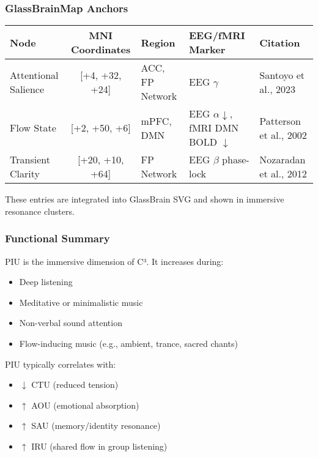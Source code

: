 \subsubsection*{GlassBrainMap Anchors}

\begin{center}
\begin{tabular}{|l|c|l|l|l|}
\hline
\textbf{Node} & \textbf{MNI Coordinates} & \textbf{Region} & \textbf{EEG/fMRI Marker} & \textbf{Citation} \\
\hline
Attentional Salience & [+4, +32, +24] & ACC, FP Network & EEG $\gamma$ & Santoyo et al., 2023 \\
Flow State & [+2, +50, +6] & mPFC, DMN & EEG $\alpha \downarrow$, fMRI DMN BOLD $\downarrow$ & Patterson et al., 2002 \\
Transient Clarity & [+20, +10, +64] & FP Network & EEG $\beta$ phase-lock & Nozaradan et al., 2012 \\
\hline
\end{tabular}
\end{center}

These entries are integrated into GlassBrain SVG and shown in immersive resonance clusters.

\subsubsection*{Functional Summary}

PIU is the immersive dimension of C³. It increases during:

\begin{itemize}
    \item Deep listening
    \item Meditative or minimalistic music
    \item Non-verbal sound attention
    \item Flow-inducing music (e.g., ambient, trance, sacred chants)
\end{itemize}

PIU typically correlates with:

\begin{itemize}
    \item $\downarrow$ CTU (reduced tension)
    \item $\uparrow$ AOU (emotional absorption)
    \item $\uparrow$ SAU (memory/identity resonance)
    \item $\uparrow$ IRU (shared flow in group listening)
\end{itemize}

